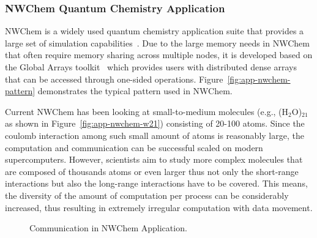 \subsubsection{NWChem Quantum Chemistry Application}
NWChem is a widely used quantum chemistry application suite that provides
a large set of simulation capabilities~\cite{nwchem}. Due to the large
memory needs in NWChem that often require memory sharing across multiple
nodes, it is developed based on the Global Arrays toolkit~\cite{GA_SC94}
which provides users with distributed dense arrays that can be accessed
through one-sided operations. Figure~\ref{fig:app-nwchem-pattern}
demonstrates the typical  pattern used in NWChem.

Current NWChem has been looking at small-to-medium molecules (e.g.,
(H$_2$O)$_{21}$ as shown in Figure~\ref{fig:app-nwchem-w21}) consisting of
20-100 atoms. Since the coulomb interaction among such small amount of
atoms is reasonably large, the computation and communication can be
successful scaled on modern supercomputers. However, scientists aim to
study more complex molecules that are composed of thousands atoms or even
larger thus not only the short-range interactions but also the long-range
interactions have to be covered. This means, the diversity of the amount
of computation per process can be considerably increased, thus resulting
in extremely irregular computation with data movement.

\begin{figure}[ht]
\centering
{}
\caption{Communication in NWChem Application.}
\label{fig:app-nwchem}
\end{figure}


